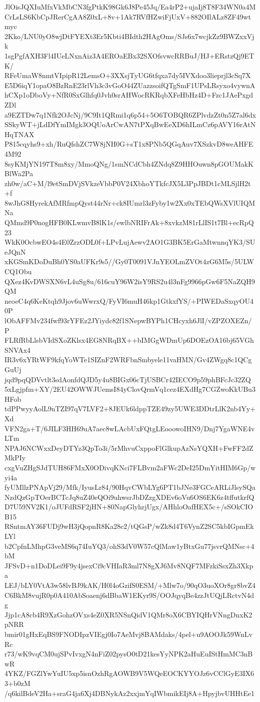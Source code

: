 JlOisJQXIuMfxVkMbCN3fgPtkK98Gk6J8Pe45Jq/Ea4rP2+ujaIj8T8F34WN0a4M
CrLsLS6KbCpJRerCgAA8Z0xL+8v+1Ak7RVfHZwiFjUxV+882OIlALz8ZF49wtmyc
2Kko/LNU0yO8wjDtFYEXt3Er5Kbti4BIdth2HAgOms/SJs6x7wcjkZz9BWZxxVjk
1sgPgfAXH3Fl4IUeLNxnAiz3A4EROaEBx32SXOfsvwcRRBuJ/HJ+ERstzQj9ETK/
RFeUmaW8nmtVIpipR12LemsO+3XXsjTyUG6tfqxa7dy5IVXdoo3lieprjl3cSq7X
E5D6iqY1opaO8BzRnE23rlVh3c3vGoO44ZUazzsoifQTgSmF1UPsLRsyxo4vywnA
hCXp1oDboVy+NfR0SxGlhfq0Jvh0srAHWocRKRqbXFeHbHz4D+Fzc1JAePxgdZDl
a9EZTDw7q1Nfk2OJcNj/9C9It1QRmi1q6p54+5O6TOBQR6ZPlvdzZt0n5Z7al6dx
SSkyWT+jLdDfYmIMgk3OQUoArCwAN7tPXqBwEeXD6hILmCz6pAVY16rAtNHqTNAX
P815cqyhs9+xh/RuQfshZC7W8jNH0G+sT1x8PNb5QGqAuv7XSzkvD8weAHFE4M92
8syKMjYN197T8m8xy/MmoQNg/1smNCdCbh4ZNdq8Z9HHOuwn8pGOUMakKBlWa2Pa
zh0w/aC+M/l9etSmDVjSVkzeVbbP0V24XbhoYTkfcJX5L3PpJBDt1cMLSjlH2t+f
8wJhG8HyrekAfMRfmpQyst44rNr+ck8IUmrl3zFyby1w2Xx0xTEbQWsXVlUIQMNa
QMmd9P0nogHFB0KLwmvB8lK1s/ewlbNRIFrAk+8xvkzM81rLlIS1t7Bl+ecRpQ23
WkK0OcbwEO4s4E0ZrzODL0f+LPvLujAewv2AO1G3BK5ErGaMtwnnqYK3/SUeJQnN
xKGSmKDoDuBh0YS0aUFKr9s5//Gy0T0091VJnYEOLmZVOt4zG6M5s/5ULWCQ1Obu
QXez4KvDWSXN6vL4uSg8u/616cuY96W2isY9RS2u4l3nFg9966pGw6F5NaZQH9QM
neoeC4q6KeKtqh9Jjov6uWwrxQ/FyVI6muH46kp1GtkxfYS/+PIWEDaSxqyOU40P
lObAFFMv234fwf93rYFEz2JYiydc82f1SNepwBYPh1CHcyxh6JlI/vZPZOXEZn/P
FLRfRbLlsbVIdSXoZKlsx4EG8NRqBX++bIMGgWDmUp6DOEzOA16bj65VGhSNVAx4
IR3v6xYRtWF9kfqYoWTe1SIZnF2WRFbnSmbyele11vaHMN/Gv4ZWgq8c1QCgGuUj
jqd9pqQDVvtlt3sdAonfdQJD5y4u8BIGx06cTjUSBCr42IECO9p59phBFcJc32ZQ
5xLgjpfm+XY/2EU42OWWJUemsI84yClovQrmVq1cez4EXdHg7CGZwoKkUBu3HFob
tdPPwyyAolL9nTZI97qV7LVF2+8JEUk6ldppTZE49zy5UWE3DDtrLlK2nb4Yy+Xd
VFN2ga+T/6JILF3HH69uA7aec8wLAcbUxFQtgLEooowoIHN9/Dnj7YgaWNE4vLTm
NPAJ6NCWxxDeyDTYz3QpTo3i/5rMhvuCxppoFlGlkupAzNsYQXH+FwFF2dZMkPIy
cxgVuZHgSJdTUH86FMxX0ODivqKNci7FLBvm2aFWc2DeI25DmYitHIM6Gp/wyi4a
fyUMllzPNApVj29/Mfk/IyusLr84/90HqvCWbLYg6PT1bJNe3FGCeARLiJlsySQa
NzdQzGpTOerBCTcJq8uZ40eQOi9uhwsrJbDZzgXDEv6oVu6OS6EK6z4tffutkrfQ
D7U59NV2K1/oJUFdRSF2jHN+80NapGlyhrjUgx/AHhloOafHEX5c+/sSOkCIOB15
RSntmAY36FUDj9wH3jQopnR8Ka28c2/tQGsP/wZk8d4T6VynZ2SC5kbIGpmEkLYl
b2CpfnLMhpG3veMS6q74IuYQ3/ohS3dV0W57cQlMaw1yBtxGu77jsvrQMNsc+4bM
JFSvD+n1DoDLei9F9y4jsexCi9cVHIaR3ml7N8gXJ6Mv8NQF7MFzkiSsxZh3Xkpa
LEJ/bLY0VtA3w58lvBJ9kAK/H0l4oGzifS0ESM/+Mlw7o/90qO3uoXOr8gr8bvZ4
C6BkM8vujR0p0A410AbSoaenj6dBbaW1EKyr9S/OOJqyqBe4zzJtUQjLRctvN4dg
Jjp1cA8cb4R9XzGohzOVxs4eZ0XR5NSnQidV1QMr8oX6CBYIQHrVNngDnxK2pNRR
bmir01gHxEqBS9FNODIpzVIEgj0Io7AeMvj8BAMdaks/4pel+u9AOOJk59WnLvRc
r73/wK9vqCM0ujSPvIvxgN4nFiZ02pysO0tD21kesYyNPK2aHuEuIStHmMC3nBwR
4YKZ/FGZlYwYuIU5xp5isnOzhRgAOWB9V5WQeEOCKYYOJz6vCClGyE3IX63+b0zM
/q6kilBdeV2Ha+sraG4ja6Xj4DBNykAz2xxjmYqIWbmikEIj8A+HpyjbvUHHtEe1
